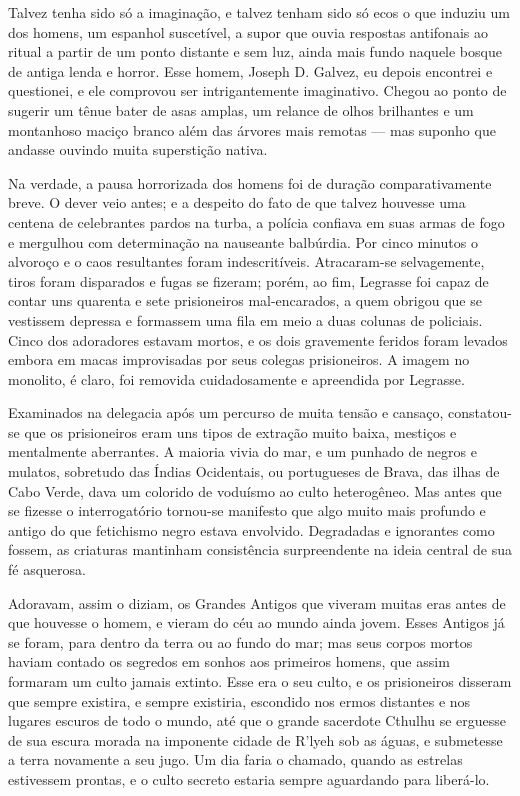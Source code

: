 Talvez tenha sido só a imaginação, e talvez tenham sido só ecos o que
induziu um dos homens, um espanhol suscetível, a supor que ouvia
respostas antifonais ao ritual a partir de um ponto distante e sem luz,
ainda mais fundo naquele bosque de antiga lenda e horror. Esse homem,
Joseph D. Galvez, eu depois encontrei e questionei, e ele comprovou ser
intrigantemente imaginativo. Chegou ao ponto de sugerir um tênue bater
de asas amplas, um relance de olhos brilhantes e um montanhoso maciço
branco além das árvores mais remotas --- mas suponho que andasse ouvindo
muita superstição nativa.

Na verdade, a pausa horrorizada dos homens foi de duração
comparativamente breve. O dever veio antes; e a despeito do fato de que
talvez houvesse uma centena de celebrantes pardos na turba, a polícia
confiava em suas armas de fogo e mergulhou com determinação na nauseante
balbúrdia. Por cinco minutos o alvoroço e o caos resultantes foram
indescritíveis. Atracaram-se selvagemente, tiros foram disparados e
fugas se fizeram; porém, ao fim, Legrasse foi capaz de contar uns
quarenta e sete prisioneiros mal-encarados, a quem obrigou que se
vestissem depressa e formassem uma fila em meio a duas colunas de
policiais. Cinco dos adoradores estavam mortos, e os dois gravemente
feridos foram levados embora em macas improvisadas por seus colegas
prisioneiros. A imagem no monolito, é claro, foi removida cuidadosamente
e apreendida por Legrasse.

Examinados na delegacia após um percurso de muita tensão e cansaço,
constatou-se que os prisioneiros eram uns tipos de extração muito baixa,
mestiços e mentalmente aberrantes. A maioria vivia do mar, e um punhado
de negros e mulatos, sobretudo das Índias Ocidentais, ou portugueses de
Brava, das ilhas de Cabo Verde, dava um colorido de voduísmo ao culto
heterogêneo. Mas antes que se fizesse o interrogatório tornou-se
manifesto que algo muito mais profundo e antigo do que fetichismo negro
estava envolvido. Degradadas e ignorantes como fossem, as criaturas
mantinham consistência surpreendente na ideia central de sua fé
asquerosa.

Adoravam, assim o diziam, os Grandes Antigos que viveram muitas eras
antes de que houvesse o homem, e vieram do céu ao mundo ainda jovem.
Esses Antigos já se foram, para dentro da terra ou ao fundo do mar; mas
seus corpos mortos haviam contado os segredos em sonhos aos primeiros
homens, que assim formaram um culto jamais extinto. Esse era o seu
culto, e os prisioneiros disseram que sempre existira, e sempre
existiria, escondido nos ermos distantes e nos lugares escuros de todo o
mundo, até que o grande sacerdote Cthulhu se erguesse de sua escura
morada na imponente cidade de R'lyeh sob as águas, e submetesse a terra
novamente a seu jugo. Um dia faria o chamado, quando as estrelas
estivessem prontas, e o culto secreto estaria sempre aguardando para
liberá-lo.

